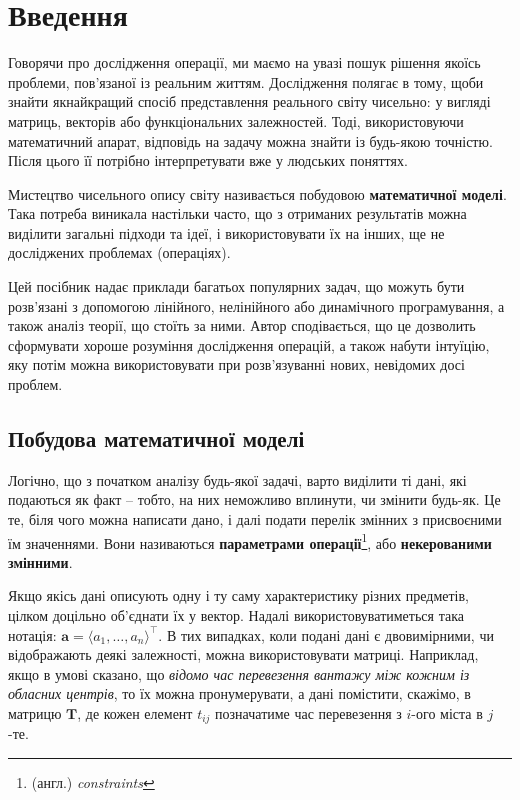 \documentclass[../book.tex]{subfiles}
\begin{document}
\chapter{Введення}

Говорячи про \flqq{}дослідження операції\frqq{}, ми маємо на увазі пошук рішення якоїсь проблеми, пов'язаної із реальним життям. Дослідження полягає в тому, щоби знайти якнайкращий спосіб представлення реального світу чисельно: у вигляді матриць, векторів або функціональних залежностей. Тоді, використовуючи математичний апарат, відповідь на задачу можна знайти із будь-якою точністю. Після цього її потрібно інтерпретувати вже у \flqq{}людських\frqq{} поняттях.

Мистецтво чисельного опису світу називається побудовою \textbf{математичної моделі}. Така потреба виникала настільки часто, що з отриманих результатів можна виділити загальні підходи та ідеї, і використовувати їх на інших, ще не досліджених проблемах (операціях).

Цей посібник надає приклади багатьох популярних задач, що можуть бути розв'язані з допомогою лінійного, нелінійного або динамічного програмування, а також аналіз теорії, що стоїть за ними. Автор сподівається, що це дозволить сформувати хороше розуміння дослідження операцій, а також набути інтуїцію, яку потім можна використовувати при розв'язуванні нових, невідомих досі проблем.

\section{Побудова математичної моделі}

Логічно, що з початком аналізу будь-якої задачі, варто виділити ті дані, які подаються як факт -- тобто, на них неможливо вплинути, чи змінити будь-як. Це те, біля чого можна написати \flqq{}дано\frqq{}, і далі подати перелік змінних з присвоєними їм значеннями. Вони називаються \textbf{параметрами операції}\footnote{(англ.) \textit{constraints}}, або \textbf{некерованими змінними}.

Якщо якісь дані описують одну і ту саму характеристику різних предметів, цілком доцільно об'єднати їх у вектор. Надалі використовуватиметься така нотація: $\mathbf{a} = \langle a_1, \ldots, a_n \rangle^\top$. В тих випадках, коли подані дані є двовимірними, чи відображають деякі залежності, можна використовувати матриці. Наприклад, якщо в умові сказано, що \textit{відомо час перевезення вантажу між кожним із обласних центрів}, то їх можна пронумерувати, а дані помістити, скажімо, в матрицю $\mathbf{T}$, де кожен елемент $t_{ij}$ позначатиме час перевезення з $i$-ого міста в $j$-те.
\end{document}
